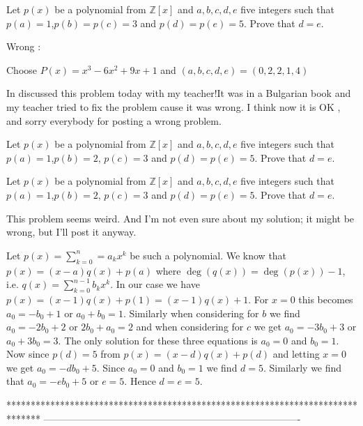 \begin{solution}
	\begin{tcolorbox}Let $p(x)$ be a polynomial from $\mathbb{Z}[x]$ and $a,b,c,d,e$ five integers such that $p(a)=1$,$p(b)=p(c)=3$ and $p(d)=p(e)=5$. Prove that $d=e$.\end{tcolorbox}
Wrong :

Choose $P(x)=x^3-6x^2+9x+1$ and $(a,b,c,d,e)=(0,2,2,1,4)$
\end{solution}



\begin{solution}
	In discussed this problem today with my teacher!It was in a Bulgarian book and my teacher tried to fix the problem cause it was wrong. I think now it is OK , and sorry everybody for posting a wrong problem.

Let $p(x)$ be a polynomial from $\mathbb{Z}[x]$ and $a,b,c,d,e$ five integers such that $p(a)=1$,$p(b)=2 $, $p(c)=3$ and $p(d)=p(e)=5$. Prove that $d=e$.
\end{solution}



\begin{solution}
	\begin{tcolorbox}
Let $p(x)$ be a polynomial from $\mathbb{Z}[x]$ and $a,b,c,d,e$ five integers such that $p(a)=1$,$p(b)=2 $, $p(c)=3$ and $p(d)=p(e)=5$. Prove that $d=e$.\end{tcolorbox}

This problem seems weird. And I'm not even sure about my solution; it might be wrong, but I'll post it anyway.

Let $p(x)=\sum_{k=0}^{n}= {{a_k x^{k}}}$ be such a polynomial. We know that $p(x)=(x-a)q(x) +p(a)$ where $\deg(q(x))=\deg(p(x))-1$, i.e. $q(x)=\sum_{k=0}^{n-1}{b_k x^k}$. In our case we have $p(x)=(x-1)q(x) +p(1)=(x-1)q(x)+1$. For $x=0$ this becomes $a_0=-b_0 +1$ or $a_0 +b_0 =1$. Similarly when considering for $b$ we find $a_0=-2b_0 +2$ or $2b_0 +a_0=2$ and when considering for $c$ we get $a_0 =-3b_0 +3$ or $a_0 +3b_0 =3$.
The only solution for these three equations is $a_0=0$ and $b_0=1$.  Now since $p(d)=5$ from $p(x)=(x-d)q(x) +p(d)$ and letting $x=0$ we get $a_0 =-db_0 +5$. Since $a_0=0$ and $b_0 =1$ we find $d=5$. Similarly we find that $a_0 =-eb_0 +5$ or $e=5$. Hence $d=e=5$.
\end{solution}
*******************************************************************************
-------------------------------------------------------------------------------

